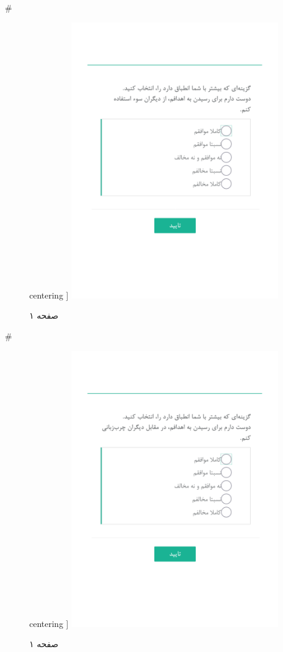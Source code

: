 { 
 # 
\begin{figure}[htpb]
centering ]
\includegraphics[width=0.8\textwidth]{./img/Task32.png/}
\caption{صفحه ۱}
\label{fig:Task1}
\end{figure}
 
 
 # 
\begin{figure}[htpb]
centering ]
\includegraphics[width=0.8\textwidth]{./img/Task33.png/}
\caption{صفحه ۱}
\label{fig:Task1}
\end{figure}
 
}
